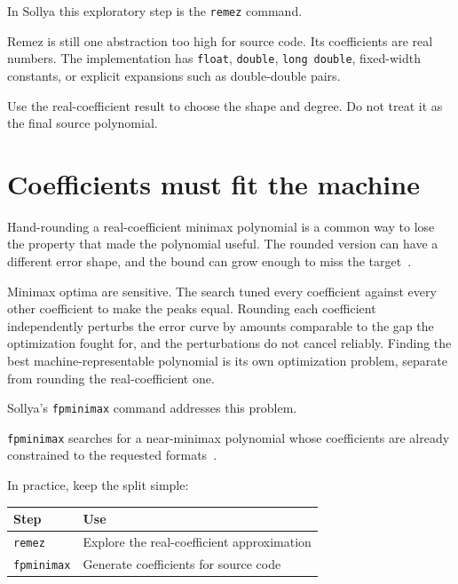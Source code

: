 \documentclass[manuscript, nonacm]{acmart}
\begin{document}
  In Sollya this exploratory step is the \texttt{remez} command.

  Remez is still one abstraction too high for source code. Its coefficients are
  real numbers. The implementation has \texttt{float}, \texttt{double},
  \texttt{long}~\texttt{double}, fixed-width constants, or explicit expansions
  such as double-double pairs.

  Use the real-coefficient result to choose the shape and degree. Do not treat
  it as the final source polynomial.



  \section{Coefficients must fit the machine}

  Hand-rounding a real-coefficient minimax polynomial is a common way to lose
  the property that made the polynomial useful. The rounded version can have a
  different error shape, and the bound can grow enough to miss the target~\cite{muller}.

  Minimax optima are sensitive. The search tuned every coefficient against
  every other coefficient to make the peaks equal. Rounding each coefficient
  independently perturbs the error curve by amounts comparable to the gap the
  optimization fought for, and the perturbations do not cancel reliably.
  Finding the best machine-representable polynomial is its own optimization
  problem, separate from rounding the real-coefficient one.

  Sollya's \texttt{fpminimax} command addresses this problem.

  \texttt{fpminimax} searches for a near-minimax polynomial whose coefficients
  are already constrained to the requested
  formats~\cite{brisebarre2007,handbook}.

  In practice, keep the split simple:

  \begin{table}[tbp]
    \centering
    \begin{tabular}{ll}
      \toprule
      Step               & Use                                        \\
      \midrule
      \texttt{remez}     & Explore the real-coefficient approximation \\
      \texttt{fpminimax} & Generate coefficients for source code      \\
      \bottomrule
    \end{tabular}
  \end{table}
\end{document}
